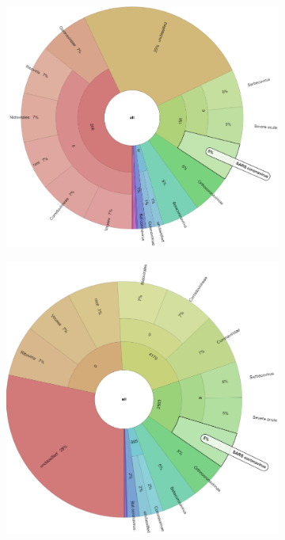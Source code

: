     \begin{figure}[H]
        \centering
        \begin{subfigure}[b]{0.45\textwidth}
        \includegraphics[width=1\textwidth]{figures/results/real/krona/krona-sf-sSRR12596166.png}
        \label{fig:results:real:krona-sf-a}
        \end{subfigure}
        \hfill
        \begin{subfigure}[b]{0.43\textwidth}
        \includegraphics[width=1\textwidth]{figures/results/real/krona/krona-sf-sSRR12596175.png}

\end{subfigure}
\end{figure}
